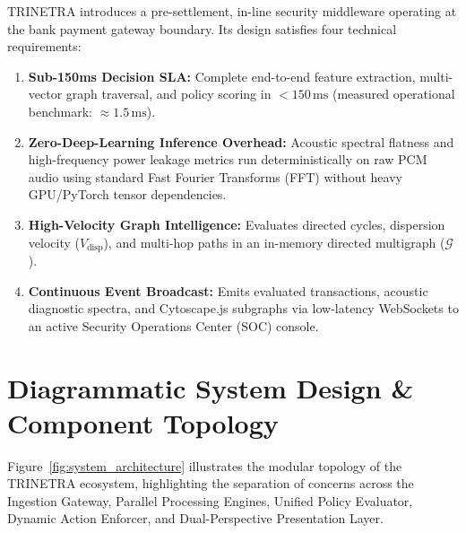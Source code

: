 \documentclass[11pt,a4paper]{article}
\begin{document}
TRINETRA introduces a pre-settlement, in-line security middleware operating at the bank payment gateway boundary. Its design satisfies four technical requirements:
\begin{enumerate}[leftmargin=1.8em, itemsep=2pt]
    \item \textbf{Sub-150ms Decision SLA:} Complete end-to-end feature extraction, multi-vector graph traversal, and policy scoring in $< 150\,\text{ms}$ (measured operational benchmark: $\approx 1.5\,\text{ms}$).
    \item \textbf{Zero-Deep-Learning Inference Overhead:} Acoustic spectral flatness and high-frequency power leakage metrics run deterministically on raw PCM audio using standard Fast Fourier Transforms (FFT) without heavy GPU/PyTorch tensor dependencies.
    \item \textbf{High-Velocity Graph Intelligence:} Evaluates directed cycles, dispersion velocity ($V_{\text{disp}}$), and multi-hop paths in an in-memory directed multigraph ($\mathcal{G}$).
    \item \textbf{Continuous Event Broadcast:} Emits evaluated transactions, acoustic diagnostic spectra, and Cytoscape.js subgraphs via low-latency WebSockets to an active Security Operations Center (SOC) console.
\end{enumerate}

\section{Diagrammatic System Design \& Component Topology}
\label{sec:system_design}

Figure~\ref{fig:system_architecture} illustrates the modular topology of the TRINETRA ecosystem, highlighting the separation of concerns across the Ingestion Gateway, Parallel Processing Engines, Unified Policy Evaluator, Dynamic Action Enforcer, and Dual-Perspective Presentation Layer.
\end{document}
